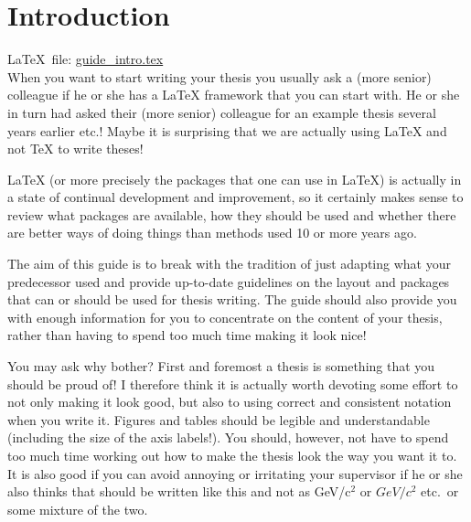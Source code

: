 \chapter{Introduction}%
\label{sec:intro}

\LaTeX\ file: \href{run:./guide_intro.tex}{guide\_intro.tex}\\[1ex]
\noindent
When you want to start writing your thesis you usually ask a (more
senior) colleague if he or she has a \gls{LaTeX} framework that you can
start with. He or she in turn had asked their (more senior) colleague
for an example thesis several years earlier etc.! Maybe it is
surprising that we are actually using \LaTeX{} and not \TeX{} to write
theses!

\LaTeX{} (or more precisely the packages that one
can use in \LaTeX) is actually in a state of continual development
and improvement, so it certainly makes sense to review what packages
are available, how they should be used and whether there are better
ways of doing things than methods used 10 or more years ago.

The aim of this guide is to break with the tradition of just adapting
what your predecessor used and provide up-to-date guidelines on the
layout and packages that can or should be used for thesis writing. The
guide should also provide you with enough information for you to
concentrate on the content of your thesis, rather than having to spend
too much time making it look nice!

You may ask why bother? First and foremost a thesis is something that
you should be proud of! I therefore think it is actually worth
devoting some effort to not only making it look good, but also to
using correct and consistent notation when you write it. Figures and
tables should be legible and understandable (including the size of the
axis labels!). You should, however, not have to spend too much time
working out how to make the thesis look the way you want it to. It is
also good if you can avoid annoying or irritating your supervisor if he
or she also thinks that \si{\GeVovercsq} should be written like this and
not as GeV/c\(^{2}\) or \(GeV/c^{2}\) etc.\ or some mixture of the two.

